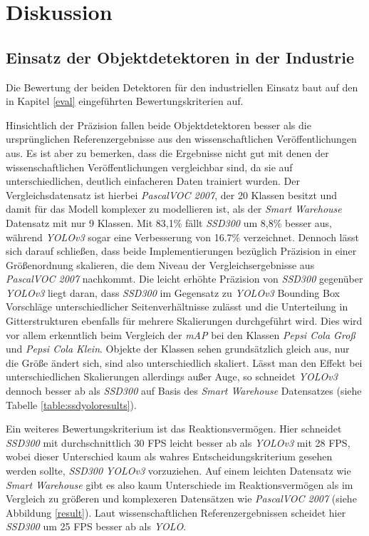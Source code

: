 \chapter{Diskussion}

\section{Einsatz der Objektdetektoren in der Industrie}

Die Bewertung der beiden Detektoren für den industriellen Einsatz baut auf den in Kapitel \ref{eval} eingeführten Bewertungskriterien auf. 

Hinsichtlich der Präzision fallen beide Objektdetektoren besser als die ursprünglichen Referenzergebnisse aus den wissenschaftlichen Veröffentlichungen aus. Es ist aber zu bemerken, dass die Ergebnisse nicht gut mit denen der wissenschaftlichen Veröffentlichungen vergleichbar sind, da sie auf unterschiedlichen, deutlich einfacheren Daten trainiert wurden. Der Vergleichsdatensatz ist hierbei \textit{PascalVOC 2007}, der 20 Klassen besitzt und damit für das Modell komplexer zu modellieren ist, als der \textit{Smart Warehouse} Datensatz mit nur 9 Klassen. Mit 83,1\% fällt \textit{SSD300} um 8,8\% besser aus, während \textit{YOLOv3} sogar eine Verbesserung von 16.7\% verzeichnet. Dennoch lässt sich darauf schließen, dass beide Implementierungen bezüglich Präzision in einer Größenordnung skalieren, die dem Niveau der Vergleichsergebnisse aus \textit{PascalVOC 2007} nachkommt. Die leicht erhöhte Präzision von \textit{SSD300} gegenüber \textit{YOLOv3} liegt daran, dass \textit{SSD300} im Gegensatz zu \textit{YOLOv3} Bounding Box Vorschläge unterschiedlicher Seitenverhältnisse zulässt und die Unterteilung in Gitterstrukturen ebenfalls für mehrere Skalierungen durchgeführt wird. Dies wird vor allem erkenntlich beim Vergleich der \textit{mAP} bei den Klassen \textit{Pepsi Cola Groß} und \textit{Pepsi Cola Klein}. Objekte der Klassen sehen grundsätzlich gleich aus, nur die Größe ändert sich, sind also unterschiedlich skaliert. Lässt man den Effekt bei unterschiedlichen Skalierungen allerdings außer Auge, so schneidet \textit{YOLOv3} dennoch besser ab als \textit{SSD300} auf Basis des \textit{Smart Warehouse} Datensatzes (siehe Tabelle \ref{table:ssdyoloresults}).

Ein weiteres Bewertungskriterium ist das Reaktionsvermögen. Hier schneidet \textit{SSD300} mit durchschnittlich 30 FPS leicht besser ab als \textit{YOLOv3} mit 28 FPS, wobei dieser Unterschied kaum als wahres Entscheidungskriterium gesehen werden sollte, \textit{SSD300} \textit{YOLOv3} vorzuziehen. Auf einem leichten Datensatz wie \textit{Smart Warehouse} gibt es also kaum Unterschiede im Reaktionsvermögen als im Vergleich zu größeren und komplexeren Datensätzen wie \textit{PascalVOC 2007} (siehe Abbildung \ref{result}). Laut wissenschaftlichen Referenzergebnissen scheidet hier \textit{SSD300} um 25 FPS besser ab als \textit{YOLO}.

